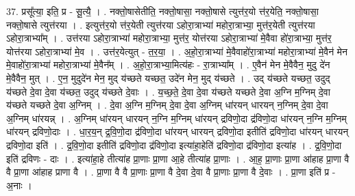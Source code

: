 \documentclass[17pt]{extarticle}
\begin{document}
37. प्रसू᳚त्या॒ इति॒ प्र - सू॒त्यै॒ । . नक्तो॒षासेतीति॒ नक्तो॒षासा॒ नक्तो॒षासे त्युत्त॑र॒यो त्त॑र॒येति॒ नक्तो॒षासा॒ नक्तो॒षासे त्युत्त॑रया । . इत्युत्त॑र॒यो त्त॑र॒येती त्युत्त॑रया ऽहोरा॒त्राभ्या॑ महोरा॒त्राभ्या॒ मुत्त॑र॒येती त्युत्त॑रया ऽहोरा॒त्राभ्या᳚म् । . उत्त॑रया ऽहोरा॒त्राभ्या॑ महोरा॒त्राभ्या॒ मुत्त॑र॒ योत्त॑रया ऽहोरा॒त्राभ्या॑ मे॒वैवा हो॑रा॒त्राभ्या॒ मुत्त॑र॒ योत्त॑रया ऽहोरा॒त्राभ्या॑ मे॒व । . उत्त॑र॒येत्युत् - त॒र॒या॒ । . अ॒हो॒रा॒त्राभ्या॑ मे॒वैवाहो॑रा॒त्राभ्या॑ महोरा॒त्राभ्या॑ मे॒वैन॑ मेन मे॒वाहो॑रा॒त्राभ्या॑ महोरा॒त्राभ्या॑ मे॒वैन᳚म् । . अ॒हो॒रा॒त्राभ्या॒मित्य॑हः - रा॒त्राभ्या᳚म् । . ए॒वैन॑ मेन मे॒वैवैन॒ मुदु दे॑न मे॒वैवैन॒ मुत् । . ए॒न॒ मुदुदे॑न मेन॒ मुद् य॑च्छते यच्छत॒ उदे॑न मेन॒ मुद् य॑च्छते । . उद् य॑च्छते यच्छत॒ उदुद् य॑च्छते दे॒वा दे॒वा य॑च्छत॒ उदुद् य॑च्छते दे॒वाः । . य॒च्छ॒ते॒ दे॒वा दे॒वा य॑च्छते यच्छते दे॒वा अ॒ग्नि म॒ग्निम् दे॒वा य॑च्छते यच्छते दे॒वा अ॒ग्निम् । . दे॒वा अ॒ग्नि म॒ग्निम् दे॒वा दे॒वा अ॒ग्निम् धा॑रयन् धारयन् न॒ग्निम् दे॒वा दे॒वा अ॒ग्निम् धा॑रयन्न् । . अ॒ग्निम् धा॑रयन् धारयन् न॒ग्नि म॒ग्निम् धा॑रयन् द्रविणो॒दा द्र॑विणो॒दा धा॑रयन् न॒ग्नि म॒ग्निम् धा॑रयन् द्रविणो॒दाः । . धा॒र॒य॒न् द्र॒वि॒णो॒दा द्र॑विणो॒दा धा॑रयन् धारयन् द्रविणो॒दा इतीति॑ द्रविणो॒दा धा॑रयन् धारयन् द्रविणो॒दा इति॑ । . द्र॒वि॒णो॒दा इतीति॑ द्रविणो॒दा द्र॑विणो॒दा इत्या॑हा॒हेति॑ द्रविणो॒दा द्र॑विणो॒दा इत्या॑ह । . द्र॒वि॒णो॒दा इति॑ द्रविणः - दाः । . इत्या॑हा॒हे तीत्या॑ह प्रा॒णाः प्रा॒णा आ॒हे तीत्या॑ह प्रा॒णाः । . आ॒ह॒ प्रा॒णाः प्रा॒णा आ॑हाह प्रा॒णा वै वै प्रा॒णा आ॑हाह प्राणा वै । . प्रा॒णा वै वै प्रा॒णाः प्रा॒णा वै दे॒वा दे॒वा वै प्रा॒णाः प्रा॒णा वै दे॒वाः । . प्रा॒णा इति॑ प्र - अ॒नाः । \newline
\end{document}
